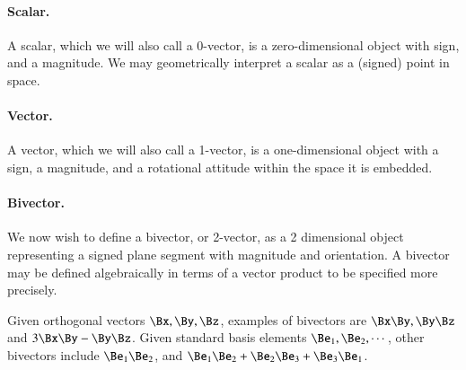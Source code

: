 \paragraph{Scalar.}
A scalar, which we will also call a 0-vector, is a zero-dimensional object with sign, and a magnitude.
We may geometrically interpret a scalar as a (signed) point in space.

\paragraph{Vector.}
A vector, which we will also call a 1-vector, is a one-dimensional object with a sign, a magnitude, and a rotational attitude within the space it is embedded.

\paragraph{Bivector.}

We now wish to define a bivector, or 2-vector, as a 2 dimensional object representing a signed plane segment with magnitude and orientation.
A bivector may be defined algebraically in terms of a vector product to be specified more precisely.

Given orthogonal vectors \( \Bx, \By, \Bz \), examples of bivectors are \( \Bx \By, \By \Bz \) and \( 3 \Bx \By - \By \Bz \).  Given standard basis elements \( \Be_1, \Be_2, \cdots \), other bivectors include \( \Be_1 \Be_2 \), and \( \Be_1 \Be_2 + \Be_2 \Be_3 + \Be_3 \Be_1 \).

